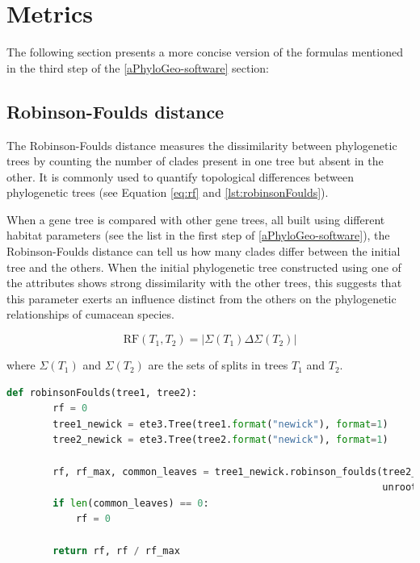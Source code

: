 \section{Metrics}\label{metrics}

The following section presents a more concise version of the formulas mentioned in the third step of the \autoref{aPhyloGeo-software} section:

\subsection{Robinson-Foulds distance}\label{RF}

The Robinson-Foulds distance measures the dissimilarity between phylogenetic trees by counting the number of clades present in one tree but absent in the other. It is commonly used to quantify topological differences between phylogenetic trees (see Equation \eqref{eq:rf} and \autoref{lst:robinsonFoulds}).

When a gene tree is compared with other gene trees, all built using different habitat parameters (see the list in the first step of \autoref{aPhyloGeo-software}), the Robinson-Foulds distance can tell us how many clades differ between the initial tree and the others. When the initial phylogenetic tree constructed using one of the attributes shows strong dissimilarity with the other trees, this suggests that this parameter exerts an influence distinct from the others on the phylogenetic relationships of cumacean species.

\begin{equation}\label{eq:rf}
    \text{RF}(T_1, T_2) = | \Sigma(T_1) \Delta \Sigma(T_2) |
\end{equation}

where $\Sigma(T_1)$ and $\Sigma(T_2)$ are the sets of splits in trees $T_1$ and $T_2$.

\begin{lstlisting}[label=lst:robinsonFoulds,language=Python,caption=Python script for calculating the Robinson-Foulds distance using the ete3 package in the aPhyloGeo package.]
    def robinsonFoulds(tree1, tree2):
        rf = 0
        tree1_newick = ete3.Tree(tree1.format("newick"), format=1)
        tree2_newick = ete3.Tree(tree2.format("newick"), format=1)

        rf, rf_max, common_leaves = tree1_newick.robinson_foulds(tree2_newick, 
                                                                 unrooted_trees=True)
        if len(common_leaves) == 0:
            rf = 0

        return rf, rf / rf_max
\end{lstlisting}


